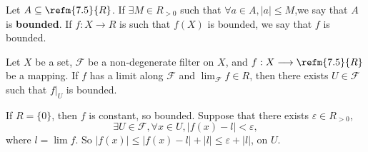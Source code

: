 \begin{definitionenv}
    Let $A\subseteq \refm{7.5}{R}$. If $\exists M\in R_{>0}$ such that $\forall a\in A, \left|a\right|\le M$,we say that $A$ is \textbf{bounded}. If $f:X\longrightarrow R$ is such that $f(X)$ is bounded, we say that $f$ is bounded.
\end{definitionenv}
\begin{corollaryenv}
    Let $X$ be a set, $\mathcal{F}$ be a non-degenerate filter on $X$, and $f:X\longrightarrow \refm{7.5}{R}$  be a mapping. If $f$ has a limit along $\mathcal{F}$ and $\lim_{\mathcal{F}}f\in R$, then there exists $U\in \mathcal{F}$ such that $f|_U$ is bounded.
\end{corollaryenv}
\begin{proofenv}
    If $R=\{0\}$, then $f$ is constant, so bounded. Suppose that there exists $\varepsilon\in R_{>0}$,
    $$\exists U\in \mathcal{F}, \forall x\in U, \left|f(x)-l\right|<\varepsilon,$$
    where $l=\lim f$. So $\left|f(x)\right|\le\left|f(x)-l\right|+\left|l\right|\le\varepsilon+\left|l\right|$, on $U$.
\end{proofenv}



